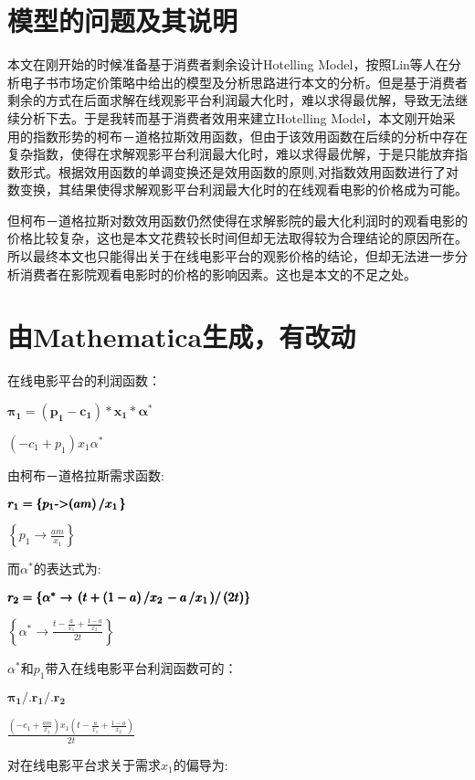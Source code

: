 \documentclass[paper=a4, fontsize=10.5pt]{scrartcl} %
\numberwithin{equation}{section} %
\numberwithin{figure}{section} %
\numberwithin{table}{section} %
\begin{document}
\begin{CJK}{UTF8}{gbsn}
\appendix
\appendixpage
\section{模型的问题及其说明}
本文在刚开始的时候准备基于消费者剩余设计Hotelling Model，按照Lin等人在分析电子书市场定价策略中给出的模型及分析思路进行本文的分析。但是基于消费者剩余的方式在后面求解在线观影平台利润最大化时，难以求得最优解，导致无法继续分析下去。于是我转而基于消费者效用来建立Hotelling Model，本文刚开始采用的指数形势的柯布－道格拉斯效用函数，但由于该效用函数在后续的分析中存在复杂指数，使得在求解观影平台利润最大化时，难以求得最优解，于是只能放弃指数形式。根据效用函数的单调变换还是效用函数的原则,对指数效用函数进行了对数变换，其结果使得求解观影平台利润最大化时的在线观看电影的价格成为可能。

但柯布－道格拉斯对数效用函数仍然使得在求解影院的最大化利润时的观看电影的价格比较复杂，这也是本文花费较长时间但却无法取得较为合理结论的原因所在。所以最终本文也只能得出关于在线电影平台的观影价格的结论，但却无法进一步分析消费者在影院观看电影时的价格的影响因素。这也是本文的不足之处。




\section{由Mathematica生成，有改动}
在线电影平台的利润函数：

\(\pmb{\pi _1= \left(p_1-c_1\right)*x_1*\alpha ^*}\)


\(\left(-c_1+p_1\right) x_1 \alpha ^*\)


由柯布－道格拉斯需求函数:

\(\pmb{r_1 = \left\{p_1\text{-$>$} (a m)\left/x_1\right.\right\}}\)


\(\left\{p_1\to \frac{a m}{x_1}\right\}\)


而$\alpha^*$的表达式为:

\(\pmb{r_2 = \left\{\alpha ^* \to  \left.\left(t+ (1-a)\left/ x_2\right.-a\left/x_1\right.\right)\right/(2 t)\right\}}\)


\(\left\{\alpha ^*\to \frac{t-\frac{a}{x_1}+\frac{1-a}{x_2}}{2 t}\right\}\)


$\alpha^*$和$p_1$带入在线电影平台利润函数可的：

\(\pmb{\pi _1 \text{/.} r_1 \text{/.}r_2}\)


\(\frac{\left(-c_1+\frac{a m}{x_1}\right) x_1 \left(t-\frac{a}{x_1}+\frac{1-a}{x_2}\right)}{2 t}\)


对在线电影平台求关于需求$x_1$的偏导为:


\end{CJK}
\end{document}
